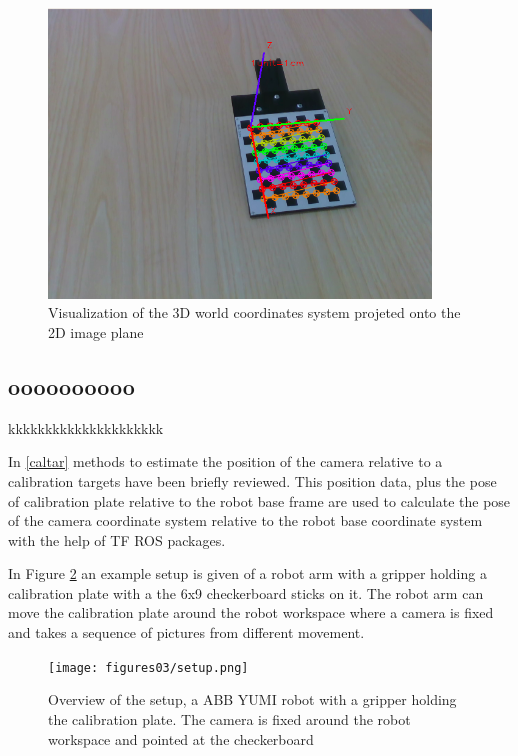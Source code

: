 \begin{figure}[!h]
\begin{center}
\includegraphics[width=4in]{figures03/calibrationtarget1.png}
\caption{Visualization of the 3D world coordinates system projeted onto the 2D image plane}
\label{fig:target3}
\end{center}
\end{figure}



\subsection{oooooooooo }
kkkkkkkkkkkkkkkkkkkkk


In \ref{caltar} methods to estimate the position of the camera relative to a calibration targets have been briefly reviewed. This position data, plus the pose of calibration plate relative to the robot base frame are used to calculate the pose of the camera coordinate system relative to the robot base coordinate system with the help of TF ROS packages.




In Figure \ref{fig:setup} an example setup is given of a robot arm with a gripper holding a calibration plate with a the 6x9  checkerboard sticks on it. The robot arm can move the calibration plate around the robot workspace where a camera is fixed and takes a sequence of pictures from different movement.


\begin{figure}[!h]
\begin{center}
\texttt{[image: figures03/setup.png]}
\caption{Overview of the setup, a ABB YUMI robot with a gripper holding the calibration plate. The camera is fixed around the robot workspace and pointed at the checkerboard}%
\label{fig:setup}
\end{center}
\end{figure}



